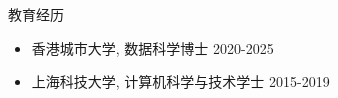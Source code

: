 \documentclass{resume} %
\begin{document}




\begin{rSection}{教育经历}

\begin{itemize}
    \item {香港城市大学}, 数据科学博士 \hfill {2020-2025}
    \item {上海科技大学}, 计算机科学与技术学士 \hfill {2015-2019} 
\end{itemize}

\end{rSection}


\def\FormatName#1{%
    \def\myname{Junyan Su}%
    \edef\name{#1}%
    \ifx\name\myname
      \underline{#1}%
    \else
       #1%
    \fi
}
\end{document}
